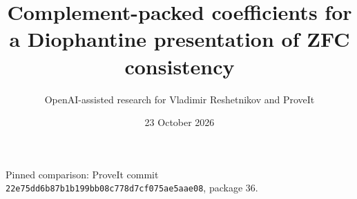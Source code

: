 \documentclass[11pt]{article}
\title{Complement-packed coefficients for a Diophantine presentation of ZFC consistency}
\author{OpenAI-assisted research for Vladimir Reshetnikov and ProveIt}
\date{23 October 2026}
\begin{document}
\maketitle
\noindent Pinned comparison: ProveIt commit
\texttt{22e75dd6b87b1b199bb08c778d7cf075ae5aae08}, package 36.

\end{document}
